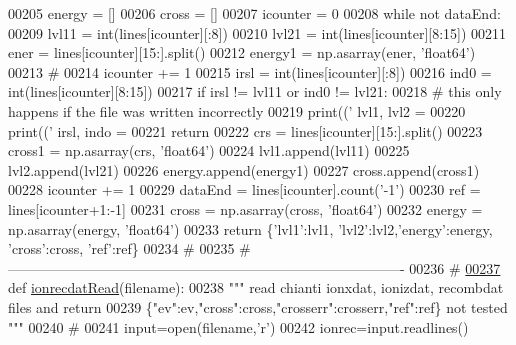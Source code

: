 \begin{DoxyCode}
{{00205     energy = []
00206     cross = []
00207     icounter = 0
00208     \textcolor{keywordflow}{while} \textcolor{keywordflow}{not} dataEnd:
00209         lvl11 = int(lines[icounter][:8])
00210         lvl21 = int(lines[icounter][8:15])
00211         ener = lines[icounter][15:].split()
00212         energy1 = np.asarray(ener, \textcolor{stringliteral}{'float64'})
00213         \textcolor{comment}{#}
00214         icounter += 1
00215         irsl = int(lines[icounter][:8])
00216         ind0 = int(lines[icounter][8:15])
00217         \textcolor{keywordflow}{if} irsl != lvl11 \textcolor{keywordflow}{or} ind0 != lvl21:
00218             \textcolor{comment}{# this only happens if the file was written incorrectly}
00219             print((\textcolor{stringliteral}{' lvl1, lvl2 = %
00220             print((\textcolor{stringliteral}{' irsl, indo = %
00221             \textcolor{keywordflow}{return}
00222         crs = lines[icounter][15:].split()
00223         cross1 = np.asarray(crs, \textcolor{stringliteral}{'float64'})
00224         lvl1.append(lvl11)
00225         lvl2.append(lvl21)
00226         energy.append(energy1)
00227         cross.append(cross1)
00228         icounter += 1
00229         dataEnd = lines[icounter].count(\textcolor{stringliteral}{'-1'})
00230     ref = lines[icounter+1:-1]
00231     cross = np.asarray(cross, \textcolor{stringliteral}{'float64'})
00232     energy = np.asarray(energy, \textcolor{stringliteral}{'float64'})
00233     \textcolor{keywordflow}{return} \{\textcolor{stringliteral}{'lvl1'}:lvl1, \textcolor{stringliteral}{'lvl2'}:lvl2,\textcolor{stringliteral}{'energy'}:energy, \textcolor{stringliteral}{'cross'}:cross,  \textcolor{stringliteral}{'ref'}:ref\}
00234     \textcolor{comment}{#}
00235     \textcolor{comment}{# -------------------------------------------------------------------------------------}
00236     \textcolor{comment}{#}
\hypertarget{__chianti__tools_8py_source_l00237}{}\hyperlink{namespacepyneb_1_1utils_1_1__chianti__tools_a552566dde90c6b3d2d8e934914d3ae76}{00237} \textcolor{keyword}{def }\hyperlink{namespacepyneb_1_1utils_1_1__chianti__tools_a552566dde90c6b3d2d8e934914d3ae76}{ionrecdatRead}(filename):
00238     \textcolor{stringliteral}{""" read chianti ionxdat, ionizdat, recombdat files and return}
00239 \textcolor{stringliteral}{    \{"ev":ev,"cross":cross,"crosserr":crosserr,"ref":ref\}  not tested """}
00240     \textcolor{comment}{#}
00241     input=open(filename,\textcolor{stringliteral}{'}\textcolor{stringliteral}{r')}
00242 \textcolor{stringliteral}{    ionrec=input.readlines()}
}}}}
\end{DoxyCode}
